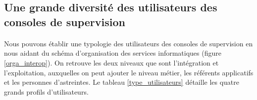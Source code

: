 		\subsection{Une grande diversité des utilisateurs des consoles de
		supervision}
			\paragraph{}%
			Nous pouvons établir une typologie des utilisateurs des consoles de
			supervision en nous aidant du schéma d’organisation
			des services informatiques (figure \ref{orga_interop}). On retrouve les
			deux niveaux que sont l’intégration et l’exploitation, auxquelles on peut
			ajouter le niveau métier, les référents applicatifs et les personnes
			d'astreintes.\newline
			Le tableau \ref{type_utilisateurs} détaille les quatre grands profils
			d’utilisateurs.
